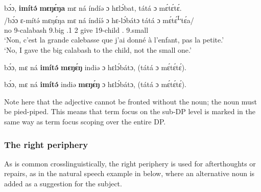 \documentclass[output=paper,colorlinks,citecolor=brown
]{langscibook}
\begin{document}
\z

\ea \label{bigcalafrontset}
\ea
\label{bigcalafront}
\glll
{\db}bɔ́ɔ,	\textbf{imítə́}	\textbf{mɛŋɛ́ŋa}	mɛ ná	índíə	ɔ hɛlɔ́bat,	tátá	ɔ	mɛ́tɛ́\ds{}tɛ́. \\
/bɔ́ɔ	ɛ-mítə́	 mɛŋɛ́ŋa	mɛ ná	índíə́	ɔ hɛ-lɔ́bátɔ	tátá	ɔ	mɛ́tɛ́\textsuperscript{L}tɛ́a/ \\
{\db}no	9-calabash	9.big	\SM{}.1\SG{} \PST{}2{}	give	\PREP{} 19-child	\COP{}.\NEG{}	\PREP{}	 9.small \\
\glt
`Non, c'est la grande calebasse que j'ai donné à l'enfant, pas la petite.' \\ `No, I gave the big calabash to the child, not the small one.' \jambox*{[EE+EB 1832] }

\ex \label{bigcalainsitu}
bɔ́ɔ,	mɛ ná	\textbf{imítə́}	\textbf{mɛŋɛ́ŋ}	indiə	ɔ hɛlɔ́bátɔ,	(tátá	ɔ	mɛ́\ds{}tɛ́tɛ́). \jambox*{[EE+EB 1834] }

\ex \label{bigcaladiscon}

bɔ́ɔ,	mɛ ná	\textbf{imítə́}	indiə	\textbf{mɛŋɛ́ŋ}	ɔ hɛlɔ́bátɔ,	(tátá	ɔ	mɛ́\ds{}tɛ́tɛ́). \jambox*{[EE+EB 1833] }
\z
\z

Note here that the adjective cannot be fronted without the noun; the noun must be pied-piped. This means that term focus on the sub-DP level is marked in the same way as term focus scoping over the entire DP.


\subsubsection{The right periphery}
As is common crosslinguistically, the right periphery is used for afterthoughts or repairs, as in the natural speech example in  below, where an alternative noun is added as a suggestion for the subject.
\end{document}
